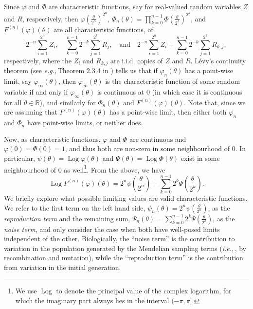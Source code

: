 \documentclass{article}
\newcommand{\ie}{\textit{i.e.,}\,}
\newcommand{\eg}{\textit{e.g.,}\,}
\newcommand{\1}{\mathbbm{1}}
\DeclareMathOperator*{\Log}{Log}
\theoremstyle{remark}
\theoremstyle{definition}
\begin{document}
Since $\varphi$ and $\Phi$ are characteristic functions, say for real-valued random variables $Z$ and $R$, respectively, then $\varphi\left(\frac{\theta}{2^{n}}\right)^{2^{n}}$, $\Phi_{n}(\theta) = \prod_{k=0}^{n-1}\Phi\left(\frac{\theta}{2^{k}}\right)^{2^{k}}$, and $F^{(n)}(\varphi)(\theta)$ are all characteristic functions, of 
\[
	 2^{-n} \sum_{i = 1}^{2^{n}} Z_{i}, \quad \sum_{k = 0}^{n-1} 2^{-k} \sum_{j = 1}^{2^{k}} R_{j}, 
	 \quad \text{and} \quad 
	 2^{-n} \sum_{i = 1}^{2^{n}} Z_{i} + \sum_{k = 0}^{n-1} 2^{-k} \sum_{j = 1}^{2^{k}} R_{k,j},
\]
respectively, where the $Z_{i}$ and $R_{k,j}$ are i.i.d. copies of $Z$ and $R$.   L\'evy's continuity theorem (see \eg Theorem 2.3.4 in \cite{Durrett2005}) tells us that if $\varphi_{n}(\theta)$ has a point-wise limit, say $\varphi_{\infty}(\theta)$, then $\varphi_{\infty}(\theta)$ is the characteristic function of some random variable if and only if $\varphi_{\infty}(\theta)$ is continuous at 0 (in which case it is continuous for all $\theta \in \mathbb{R}$), and similarly for $\Phi_{n}(\theta)$ and $F^{(n)}(\varphi)(\theta)$.  Note that, since we are assuming that $F^{(n)}(\varphi)(\theta)$ has a point-wise limit, then either both $\varphi_{n}$ and $\Phi_{n}$ have point-wise limits, or neither does.

Now, as characteristic functions, $\varphi$ and $\Phi$ are continuous and $\varphi(0) = \Phi(0) = 1$, and thus both are non-zero in some neighbourhood of 0. In particular, $\psi(\theta) = \Log{\varphi}(\theta)$ and $\Psi(\theta) = \Log{\Phi(\theta)}$ exist in some neighbourhood of 0 as well\footnote{We use $\Log$ to denote the principal value of the complex logarithm, for which the imaginary part always lies in the interval $(-\pi,\pi]$.}.  From the above, we have
\[
	\Log{F^{(n)}(\varphi)(\theta)} = {\textstyle 2^{n} \psi\left(\frac{\theta}{2^{n}}\right)} 
		+ \sum_{k=0}^{n-1}  {\textstyle 2^{k} \Psi\left(\frac{\theta}{2^{k}}\right)}.
\]
We briefly explore what possible limiting values are valid characteristic functions. 
We refer to the first term on the left hand side, $\psi_{n}(\theta) = 2^{n} \psi\left(\frac{\theta}{2^{n}}\right)$,  as the \emph{reproduction term} and the remaining sum, $\Psi_{n}(\theta) = \sum_{k=0}^{n-1} 2^{k} \Psi\left(\frac{\theta}{2^{k}}\right)$, as the \emph{noise term}, and only consider the case 
when both have well-posed limits independent of the other.  %
Biologically, 
the ``noise term'' is the contribution to variation in the population
generated by the Mendelian sampling terms (\ie, by recombination and mutation),
while the ``reproduction term'' is the contribution from variation in the initial generation.
\end{document}
